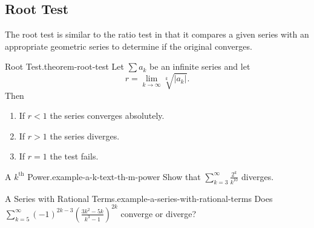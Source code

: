 \documentclass[10pt,]{book}
\numberwithin{equation}{section}
\newcommand{\lt}{<}
\newcommand{\gt}{>}
\begin{document}
\subsection[{Root Test}]{Root Test}\label{subsection-root-test}
\hypertarget{p-923}{}%
The root test is similar to the ratio test in that it compares a given series with an appropriate geometric series to determine if the original converges.%
\begin{theorem}{Root Test.}{}{theorem-root-test}%
\hypertarget{p-924}{}%
Let \(\sum a_{k}\) be an infinite series and let%
\begin{equation*}
r = \lim_{k\to\infty}\sqrt[k]{|a_{k}|}\text{.}
\end{equation*}
Then \leavevmode%
\begin{enumerate}
\item\hypertarget{li-104}{}\hypertarget{p-925}{}%
If \(r \lt 1\) the series converges absolutely.%
\item\hypertarget{li-105}{}\hypertarget{p-926}{}%
If \(r \gt 1\) the series diverges.%
\item\hypertarget{li-106}{}\hypertarget{p-927}{}%
If \(r = 1\) the test fails.%
\end{enumerate}
%
\end{theorem}
\begin{example}{A \(k^{\text{th}}\) Power.}{example-a-k-text-th-m-power}%
\hypertarget{p-928}{}%
Show that \(\sum_{k=3}^{\infty}\frac{2^{k}}{k^{10}}\) diverges.%
\end{example}
\begin{example}{A Series with Rational Terms.}{example-a-series-with-rational-terms}%
\hypertarget{p-929}{}%
Does \(\sum_{k=5}^{\infty}(-1)^{2k - 3}\left(\frac{3k^{2} - 5k}{k^{3} - 1}\right)^{2k}\) converge or diverge?%
\end{example}
%
%
\typeout{************************************************}
\typeout{************************************************}
%
\end{document}
